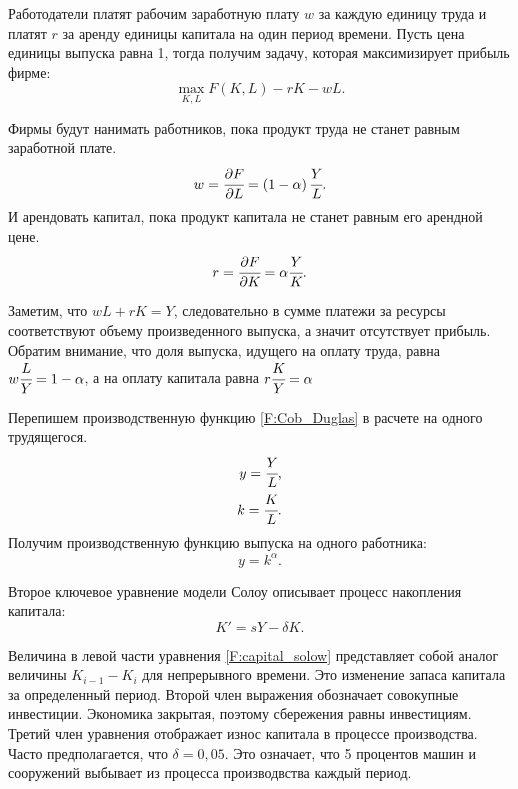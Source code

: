 Работодатели платят рабочим заработную плату $w$ за каждую единицу труда и платят $r$ за аренду единицы капитала на один период времени.
Пусть цена единицы выпуска равна 1, тогда получим задачу, которая максимизирует прибыль фирме:
\begin{equation}
	\max\limits_{K, L} F(K,L) - rK - wL\text{.}
\end{equation}

Фирмы будут нанимать работников, пока продукт труда не станет равным заработной плате.
\begin{equation*}
	w = \cfrac{\partial F}{\partial L} = \left(1-\alpha\right)\cfrac{Y}{L}\text{.}
\end{equation*}
И арендовать капитал, пока продукт капитала не станет равным его арендной цене.
\begin{equation*}
	r = \cfrac{\partial F}{\partial K} = \alpha\cfrac{Y}{K}\text{.}
\end{equation*}

Заметим, что $wL + rK = Y$, следовательно в сумме платежи за ресурсы соответствуют объему произведенного выпуска, а значит отсутствует прибыль.
Обратим внимание, что доля выпуска, идущего на оплату труда, равна $w\cfrac{L}{Y} = 1 - \alpha$, а на оплату капитала равна $r\cfrac{K}{Y} = \alpha$

Перепишем производственную функцию \ref{F:Cob_Duglas} в расчете на одного трудящегося.
\begin{align*}
y = \cfrac{Y}{L}\text{,}\\
k = \cfrac{K}{L}\text{.}
\end{align*}
Получим производственную функцию выпуска на одного работника:
\begin{equation}
	y = k^{\alpha}\text{.}
\label{F:proiz_per_worker}
\end{equation}

Второе ключевое уравнение модели Солоу описывает процесс накопления капитала:
\begin{equation}
K' = sY-\delta K \text{.}
\label{F:capital_solow}
\end{equation}

Величина в левой части уравнения \ref{F:capital_solow} представляет собой аналог величины $K_{i-1} - K_{i}$ для непрерывного времени.
Это изменение запаса капитала за определенный период.
Второй член выражения обозначает совокупные инвестиции.
Экономика закрытая, поэтому сбережения равны инвестициям.
Третий член уравнения отображает износ капитала в процессе производства.
Часто предполагается, что $\delta = 0,05$.
Это означает, что 5 процентов машин и сооружений выбывает из процесса производвства каждый период.

